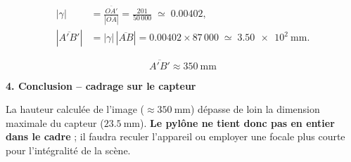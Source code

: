 \documentclass[answers]{exam}
\begin{document}
\begin{questions}
\begin{questions}
\begin{solution}
\begin{align*}
  |\gamma| &= \frac{\overline{OA'}}{|\overline{OA}|}
            = \frac{201}{50\,000}
            \;\simeq\; 0.00402, \\[6pt]
  |\overline{A'B'}| &= |\gamma|\,|\overline{AB}|
                     = 0.00402 \times 87\,000
                     \;\simeq\; \SI{3.50e2}{\milli\metre}.
\end{align*}

\[
  \boxed{\displaystyle \overline{A'B'} \approx \SI{350}{\milli\metre}}
\]

\bigskip
\textbf{4. Conclusion – cadrage sur le capteur}

La hauteur calculée de l’image (\(\approx\SI{350}{\milli\metre}\)) dépasse de 
loin la dimension maximale du capteur (\(\SI{23.5}{\milli\metre}\)).  
\textbf{Le pylône ne tient donc pas en entier dans le cadre} ; il faudra 
reculer l’appareil ou employer une focale plus courte pour l’intégralité de la 
scène.
\end{solution}

\end{questions}

\end{questions}
\end{document}
